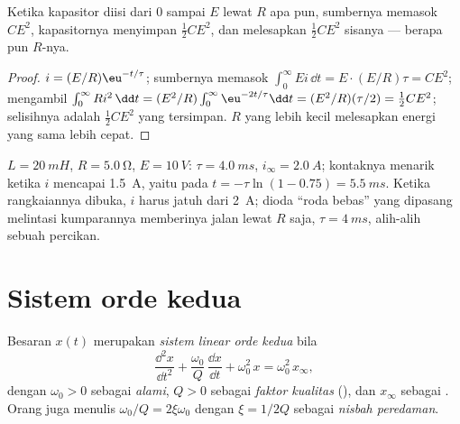\begin{proposition}\label{prop:b1:transient-regimes:rcenergy}
Ketika kapasitor diisi dari $0$ sampai $E$ lewat  $R$ apa pun,
sumbernya memasok $CE^2$, kapasitornya menyimpan $\tfrac12 CE^2$, dan
 melesapkan $\tfrac12 CE^2$ sisanya --- berapa pun $R$-nya.
\end{proposition}

\begin{proof}
$i = (E/R)\eu^{-t/\tau}$; sumbernya memasok $\int_0^\infty Ei\,\dd t
= E \cdot (E/R)\tau = CE^2$;  mengambil $\int_0^\infty Ri^2\,\dd t
= (E^2/R)\int_0^\infty \eu^{-2t/\tau}\dd t = (E^2/R)(\tau/2) = \tfrac12 CE^2$;
selisihnya adalah $\tfrac12 CE^2$ yang tersimpan. $R$ yang lebih kecil
melesapkan energi yang sama lebih cepat.
\end{proof}

\begin{example}\label{ex:b1:transient-regimes:relay}
$L = \qty{20}{mH}$, $R = \qty{5.0}{\ohm}$, $E = \qty{10}{V}$: $\tau =
\qty{4.0}{ms}$, $i_\infty = \qty{2.0}{A}$; kontaknya menarik ketika
$i$ mencapai \qty{1.5}{A}, yaitu pada $t = -\tau\ln(1 - 0.75) =
\qty{5.5}{ms}$. Ketika rangkaiannya dibuka, $i$ harus jatuh dari
\qty{2}{A}; dioda ``roda bebas'' yang dipasang melintasi kumparannya
memberinya jalan lewat $R$ saja, $\tau = \qty{4}{ms}$, alih-alih sebuah percikan.
\end{example}

\section{Sistem orde kedua}

\begin{definition}\label{def:b1:transient-regimes:secondorder}
Besaran $x(t)$ merupakan \emph{sistem linear orde kedua} bila
\[
\frac{\dd^2 x}{\dd t^2} + \frac{\omega_0}{Q}\,\frac{\dd x}{\dd t} + \omega_0^2\,x
= \omega_0^2\,x_\infty ,
\]
dengan $\omega_0 > 0$ sebagai \emph{ alami}, $Q > 0$
sebagai \emph{faktor kualitas} (), dan $x_\infty$ sebagai
. Orang juga menulis $\omega_0/Q = 2\xi\omega_0$ dengan
$\xi = 1/2Q$ sebagai \emph{nisbah peredaman}.
\end{definition}

